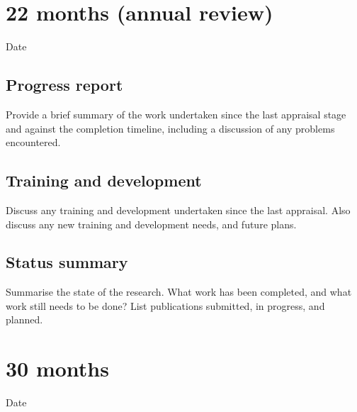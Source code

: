\documentclass[12pt,a4paper]{article}
\begin{document}
\section{22 months (annual review)}

\begin{description}
	\item[Date] %
\end{description}

\subsection{Progress report}
Provide a brief summary of the work undertaken since the last appraisal stage and against the completion timeline, including a discussion of any problems encountered. %

\subsection{Training and development}
Discuss any training and development undertaken since the last appraisal. Also discuss any new training and development needs, and future plans. %

\subsection{Status summary}
Summarise the state of the research. What work has been completed, and what work still needs to be done? List publications submitted, in progress, and planned. %


\section{30 months}

\begin{description}
	\item[Date] %
\end{description}
\end{document}

